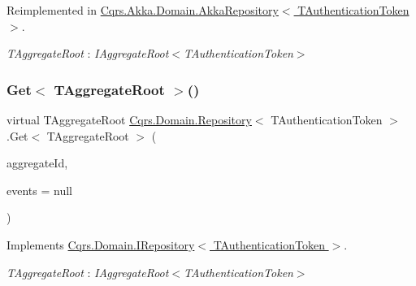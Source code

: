 Reimplemented in \hyperlink{classCqrs_1_1Akka_1_1Domain_1_1AkkaRepository_ad8861fdcfc749c9caae4dacf1284aa7d}{Cqrs.\+Akka.\+Domain.\+Akka\+Repository$<$ T\+Authentication\+Token $>$}.

\begin{Desc}
\item[Type Constraints]\begin{description}
\item[{\em T\+Aggregate\+Root} : {\em I\+Aggregate\+Root$<$T\+Authentication\+Token$>$}]\end{description}
\end{Desc}
\mbox{\label{classCqrs_1_1Domain_1_1Repository_ac83c06d643620a087232f5425d7ab1e3}} 
\subsubsection{\texorpdfstring{Get$<$ T\+Aggregate\+Root $>$()}{Get< TAggregateRoot >()}}
{\footnotesize\ttfamily virtual T\+Aggregate\+Root \hyperlink{classCqrs_1_1Domain_1_1Repository}{Cqrs.\+Domain.\+Repository}$<$ T\+Authentication\+Token $>$.Get$<$ T\+Aggregate\+Root $>$ (\begin{DoxyParamCaption}\item[{Guid}]{aggregate\+Id,  }\item[{I\+List$<$ \hyperlink{interfaceCqrs_1_1Events_1_1IEvent}{I\+Event}$<$ T\+Authentication\+Token $>$$>$}]{events = {\ttfamily null} }\end{DoxyParamCaption})\hspace{0.3cm}{\ttfamily [virtual]}}



Implements \hyperlink{interfaceCqrs_1_1Domain_1_1IRepository_a9a6f6fe2ae808009344f1eb8ad96f448}{Cqrs.\+Domain.\+I\+Repository$<$ T\+Authentication\+Token $>$}.

\begin{Desc}
\item[Type Constraints]\begin{description}
\item[{\em T\+Aggregate\+Root} : {\em I\+Aggregate\+Root$<$T\+Authentication\+Token$>$}]\end{description}
\end{Desc}
\mbox{\label{classCqrs_1_1Domain_1_1Repository_a2ac905ff69a4dc44528de0ee6799474c}} 
